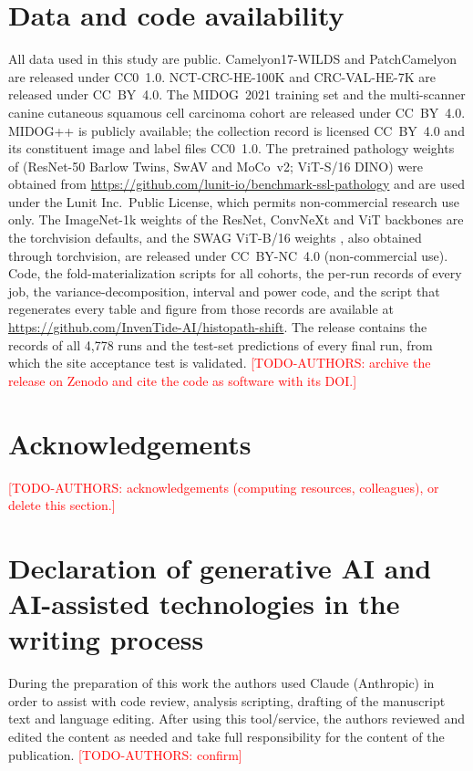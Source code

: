 \documentclass[a4paper,fleqn]{cas-sc}
\newcommand{\doilink}[1]{\href{https://doi.org/#1}{doi:#1}}
\newcommand{\coderepo}{\url{https://github.com/InvenTide-AI/histopath-shift}}
\newcommand{\todoauthors}[1]{\textcolor{red}{[TODO-AUTHORS: #1]}}
\begin{document}
\section*{Data and code availability}
All data used in this study are public. Camelyon17-WILDS
\citep{koh2021wilds,bandi2019camelyon17} and PatchCamelyon
\citep{veeling2018pcam} are released under CC0~1.0. NCT-CRC-HE-100K and
CRC-VAL-HE-7K \citetext{\citealp{kather2018nct,kather2019predicting};
Zenodo, \doilink{10.5281/zenodo.1214456}} are released under CC~BY~4.0. The MIDOG~2021 training
set \citetext{\citealp{aubreville2023midog}; Zenodo,
\doilink{10.5281/zenodo.4643381}} and the multi-scanner canine cutaneous
squamous cell carcinoma cohort \citetext{\citealp{wilm2023canine}; Zenodo,
\doilink{10.5281/zenodo.7418555}} are released under CC~BY~4.0. MIDOG++ \citetext{\citealp{aubreville2023midogpp}; figshare,
\doilink{10.6084/m9.figshare.c.6615571.v1}} is publicly available; the collection record is licensed
CC~BY~4.0 and its constituent image and label files CC0~1.0. The pretrained
pathology weights of \citet{kang2023benchmarking} (ResNet-50 Barlow Twins,
SwAV and MoCo~v2; ViT-S/16 DINO) were obtained from
\url{https://github.com/lunit-io/benchmark-ssl-pathology} and are used under
the Lunit Inc.\ Public License, which permits non-commercial research use only.
The ImageNet-1k weights of the ResNet, ConvNeXt and ViT backbones are the
torchvision defaults, and the SWAG ViT-B/16 weights \citep{singh2022swag},
also obtained through torchvision, are released under CC~BY-NC~4.0
(non-commercial use).
Code, the fold-materialization scripts for all cohorts, the per-run records
of every job, the variance-decomposition, interval and power code, and the
script that regenerates every table and figure from those records are
available at \coderepo.
The release contains the records of all 4,778 runs and the test-set
predictions of every final run, from which the site acceptance test is
validated.
\todoauthors{archive the release on Zenodo and cite the code as software with
its DOI.}

\section*{Acknowledgements}
\todoauthors{acknowledgements (computing resources, colleagues), or delete
this section.}

\section*{Declaration of generative AI and AI-assisted technologies in the writing process}
During the preparation of this work the authors used Claude (Anthropic) in
order to assist with code review, analysis scripting, drafting of the
manuscript text and language editing.
After using this tool/service, the authors reviewed and edited the content as
needed and take full responsibility for the content of the publication.
\todoauthors{confirm}




\end{document}
